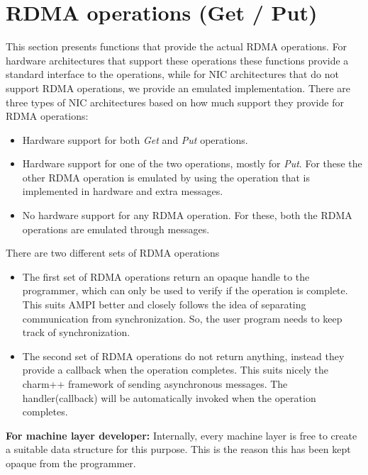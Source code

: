 \section{RDMA operations (Get / Put)}
This section presents functions that provide the actual RDMA operations.
For hardware architectures that support these operations these functions 
provide a standard interface to the operations, while for NIC architectures that
do not support RDMA operations, we provide an emulated implementation.
There are three types of NIC architectures based on how much support they
provide for RDMA operations:
\begin{itemize}
\item Hardware support for both {\it Get} and {\it Put} operations.
\item Hardware support for one of the two operations, mostly for {\it Put}. For these
the other RDMA operation is emulated by using the operation that is implemented
in hardware and extra messages.
\item No hardware support for any RDMA operation. For these, both the RDMA operations
are emulated through messages.
\end{itemize}

There are two different sets of RDMA operations
\begin{itemize}
\item The first set of RDMA operations return an opaque handle to the programmer, 
which can only be used to verify if the operation is complete. This suits
AMPI better and closely follows the idea of separating communication
from synchronization. So, the user program needs to keep track of 
synchronization.
\item The second set of RDMA operations do not return anything, instead they
provide a callback when the operation completes. This suits nicely the charm++
framework of sending asynchronous messages. The handler(callback) will be 
automatically invoked when the operation completes.
\end{itemize}

{\bf For machine layer developer:} Internally, every machine layer is free
to create a suitable data structure for this purpose. This is the reason this
has been kept opaque from the programmer.


